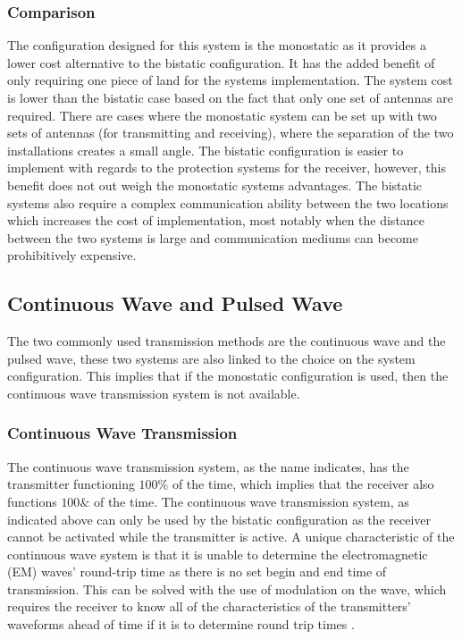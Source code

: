 \documentclass[11pt]{witseiepaper}
\begin{document}
\begin{bibunit}[witseie]
\subsubsection{Comparison} \label{sec:Comparison}
The configuration designed for this system is the monostatic as it provides a lower cost alternative to the bistatic configuration. It has the added benefit of only requiring one piece of land for the systems implementation. The system cost is lower than the bistatic case based on the fact that only one set of antennas are required. There are cases where the monostatic system can be set up with two sets of antennas (for transmitting and receiving), where the separation of the two installations creates a small angle.
The bistatic configuration is easier to implement with regards to the protection systems for the receiver, however, this benefit does not out weigh the monostatic systems advantages. The bistatic systems also require a complex communication ability between the two locations which increases the cost of implementation, most notably when the distance between the two systems is large and communication mediums can become prohibitively expensive.

\subsection{Continuous Wave and Pulsed Wave} \label{sec:ContinuousWaveandPulsedWave}

The two commonly used transmission methods are the continuous wave and the pulsed wave, these two systems are also linked to the choice on the system configuration.
This implies that if the monostatic configuration is used, then the continuous wave transmission system is not available.

\subsubsection{Continuous Wave Transmission} \label{sec:ContinuousWaveTransmission}

The continuous wave transmission system, as the name indicates, has the transmitter functioning $100\%$ of the time, which implies that the receiver also functions $100 \&$ of the time. The continuous wave transmission system, as indicated above can only be used by the bistatic configuration as the receiver cannot be activated while the transmitter is active.
A unique characteristic of the continuous wave system is that it is unable to determine the electromagnetic (EM) waves' round-trip time as there is no set begin and end time of transmission. This can be solved with the use of modulation on the wave, which requires the receiver to know all of the characteristics of the transmitters' waveforms ahead of time if it is to determine round trip times \cite[p.~20]{radarHandbook}.


\end{bibunit}
\end{document}

